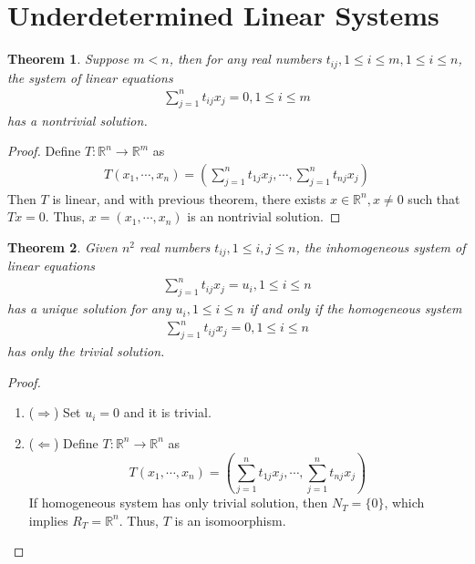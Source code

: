 \documentclass[11pt]{book}
\newtheorem{theorem}{Theorem}[section]
\theoremstyle{definition}
\numberwithin{equation}{subsection}
\begin{document}
\medskip

\section{Underdetermined Linear Systems}
\begin{theorem}
Suppose $m < n$, then for any real numbers $t_{ij}, 1\leq i\leq m, 1\leq i\leq n$, the system of linear equations
\begin{align*}
    \sum^n_{j=1}t_{ij} x_j = 0, 1\leq i \leq m
\end{align*}
has a nontrivial solution.
\end{theorem}
\begin{proof}
Define $T:\mathbb{R}^n\to\mathbb{R}^m$ as
\begin{align*}
    T(x_1,\cdots,x_n) = \left(\sum^n_{j=1}t_{1j} x_j, \cdots, \sum^n_{j=1}t_{nj} x_j\right)
\end{align*}
Then $T$ is linear, and with previous theorem, there exists $x\in\mathbb{R}^n, x\neq 0$ such that $T x = 0$. Thus, $x = (x_1,\cdots,x_n)$ is an nontrivial solution.
\end{proof}

\medskip

\begin{theorem}
Given $n^2$ real numbers $t_{ij}, 1\leq i,j\leq n$, the inhomogeneous system of linear equations
\begin{align*}
    \sum^n_{j=1}t_{ij} x_j = u_i, 1\leq i \leq n
\end{align*}
has a unique solution for any $u_i, 1\leq i \leq n$ if and only if the homogeneous system
\begin{align*}
    \sum^n_{j=1}t_{ij} x_j = 0, 1\leq i \leq n
\end{align*}
has only the trivial solution.
\end{theorem}
\begin{proof}
~\begin{enumerate}[label=(\arabic*)]
    \item ($\Rightarrow$) Set $u_i = 0$ and it is trivial.
    \item ($\Leftarrow$) Define $T:\mathbb{R}^n\to\mathbb{R}^n$ as 
    $$T(x_1,\cdots,x_n) = \left(\sum^n_{j=1}t_{1j} x_j, \cdots, \sum^n_{j=1}t_{nj} x_j\right)$$
    If homogeneous system has only trivial solution, then $N_T = \{0\}$, which implies $R_T = \mathbb{R}^n$. Thus, $T$ is an isomoorphism. 
\end{enumerate}
\end{proof}
\end{document}

